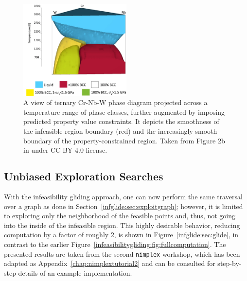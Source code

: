\begin{figure}[H]
    \centering
    \includegraphics[width=0.5\textwidth]{infeasibilitygliding/PhaseTernaryMap_Elder2023.png}
    \caption{A view of ternary Cr-Nb-W phase diagram projected across a temperature range of phase classes, further augmented by imposing predicted property value constraints. It depicts the smoothness of the infeasible region boundary (red) and the increasingly smooth boundary of the property-constrained region. Taken from Figure 2b in \citet{Elder2023ComputationalValidation} under CC BY 4.0 license.}
    \label{infeasibilitygliding:fig:katesphasemap}
\end{figure}


\subsection{Unbiased Exploration Searches} \label{infglide:ssec:unbiasedexplore}

With the infeasibility gliding approach, one can now perform the same traversal over a graph as done in Section~\ref{infglide:sec:exploitgraph}; however, it is limited to exploring only the neighborhood of the feasible points and, thus, not going into the inside of the infeasible region. This highly desirable behavior, reducing computation by a factor of roughly 2, is shown in Figure~\ref{infglide:sec:glide}, in contrast to the earlier Figure~\ref{infeasibilitygliding:fig:fullcomputation}. The presented results are taken from the second \texttt{nimplex} workshop, which has been adapted as Appendix~\ref{chap:nimplextutorial2} and can be consulted for step-by-step details of an example implementation.


